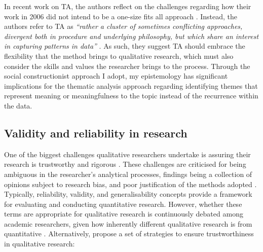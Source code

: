 In \cite{braun_one_2020} recent work on TA, the authors reflect on the challenges regarding how their work in 2006 did not intend to be a one-size fits all approach \citep{braun_using_2006}. Instead, the authors refer to TA as \textit{``rather a cluster of sometimes conflicting approaches, divergent both in procedure and underlying philosophy, but which share an interest in capturing patterns in data''} \citep[pg.333]{braun_one_2020}. As such, they suggest TA should embrace the flexibility that the method brings to qualitative research, which must also consider the skills and values the researcher brings to the process. Through the social constructionist approach I adopt, my epistemology has significant implications for the thematic analysis approach regarding identifying themes that represent meaning or meaningfulness to the topic instead of the recurrence within the data.

\subsection{Validity and reliability in research}
\label{TA:Reliability}
One of the biggest challenges qualitative researchers undertake is assuring their research is trustworthy and rigorous \citep{finlay2006rigour}. These challenges are criticised for being ambiguous in the researcher's analytical processes, findings being a collection of opinions subject to research bias, and poor justification of the methods adopted \citep{rolfe2006validity}. Typically, reliability, validity, and generalisability concepts provide a framework for evaluating and conducting quantitative research. However, whether these terms are appropriate for qualitative research is continuously debated among academic researchers, given how inherently different qualitative research is from quantitative \citep{ryan2009rigour}. Alternatively, \cite{noble2015issues} propose a set of strategies to ensure trustworthiness in qualitative research:

